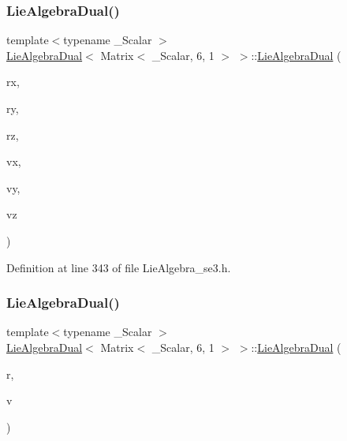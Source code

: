 \subsubsection{\texorpdfstring{Lie\+Algebra\+Dual()}{LieAlgebraDual()}\hspace{0.1cm}{\footnotesize\ttfamily [4/5]}}
{\footnotesize\ttfamily template$<$typename \+\_\+\+Scalar $>$ \\
\hyperlink{class_lie_algebra_dual}{Lie\+Algebra\+Dual}$<$ Matrix$<$ \+\_\+\+Scalar, 6, 1 $>$ $>$\+::\hyperlink{class_lie_algebra_dual}{Lie\+Algebra\+Dual} (\begin{DoxyParamCaption}\item[{Scalar}]{rx,  }\item[{Scalar}]{ry,  }\item[{Scalar}]{rz,  }\item[{Scalar}]{vx,  }\item[{Scalar}]{vy,  }\item[{Scalar}]{vz }\end{DoxyParamCaption})\hspace{0.3cm}{\ttfamily [inline]}}



Definition at line 343 of file Lie\+Algebra\+\_\+se3.\+h.

\hypertarget{class_lie_algebra_dual_3_01_matrix_3_01___scalar_00_016_00_011_01_4_01_4_ae16baa5a11793aa9621e8d72383834fe}{}\label{class_lie_algebra_dual_3_01_matrix_3_01___scalar_00_016_00_011_01_4_01_4_ae16baa5a11793aa9621e8d72383834fe} 
\subsubsection{\texorpdfstring{Lie\+Algebra\+Dual()}{LieAlgebraDual()}\hspace{0.1cm}{\footnotesize\ttfamily [5/5]}}
{\footnotesize\ttfamily template$<$typename \+\_\+\+Scalar $>$ \\
\hyperlink{class_lie_algebra_dual}{Lie\+Algebra\+Dual}$<$ Matrix$<$ \+\_\+\+Scalar, 6, 1 $>$ $>$\+::\hyperlink{class_lie_algebra_dual}{Lie\+Algebra\+Dual} (\begin{DoxyParamCaption}\item[{const typename Base\+::so3\+Element \&}]{r,  }\item[{const typename Base\+::\+Vector3 \&}]{v }\end{DoxyParamCaption})\hspace{0.3cm}{\ttfamily [inline]}}



